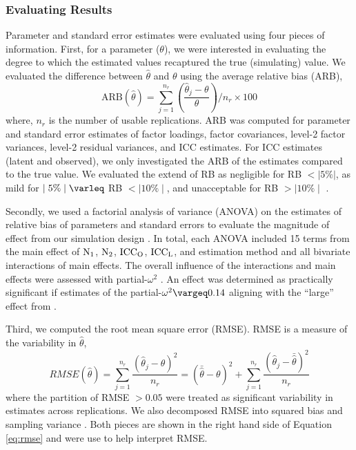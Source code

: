 \documentclass[Review,sageh,times, doublespace]{sagej}
\renewcommand{\leq}{\varleq}
\renewcommand{\geq}{\vargeq}
\begin{document}
\subsubsection{Evaluating Results}

Parameter and standard error estimates were evaluated using four pieces of information. 
First, for a parameter ($\theta$), we were interested in evaluating the degree to which the estimated values recaptured the true (simulating) value.
We evaluated the difference between $\hat{\theta}$ and $\theta$ using the average relative bias (ARB),
\begin{equation}
\mathrm{ARB}(\hat{\theta}) = \sum_{j=1}^{n_r}\left(\frac{\hat{\theta}_j- \theta}{\theta}\right)/n_r\times 100
\end{equation}
where, $n_r$ is the number of usable replications.
ARB was computed for parameter and standard error estimates of factor loadings, factor covariances, level-2 factor variances, level-2 residual variances, and ICC estimates.
For ICC estimates (latent and observed), we only investigated the ARB of the estimates compared to the true value.
We evaluated the extend of RB as negligible for RB $< | 5\% |$, as mild for $\mid 5\%\mid \leq$ RB $< \mid 10\%\mid$, and unacceptable for RB $> \mid 10\%\mid$ \citep{Hoogland1998, Muthen1985}. 

Secondly, we used a factorial analysis of variance (ANOVA) on the estimates of relative bias of parameters and standard errors to evaluate the magnitude of effect from our simulation design \citep{Bandalos2013}.
In total, each ANOVA included 15 terms from the main effect of $\rm N_1$, $\rm N_2$, $\rm ICC_{O}$, $\rm ICC_{L}$, and estimation method and all  bivariate interactions of main effects.
The overall influence of the interactions and main effects were assessed with partial-$\omega^2$ \citep[][, p. 296]{Maxwell2004}.
An effect was determined as practically significant if estimates of the partial-$\omega^2 \geq 0.14$  aligning with the ``large'' effect from \citep{Cohen1988}.

Third, we computed the root mean square error (RMSE).
RMSE is a measure of the variability in $\hat{\theta}$,
\begin{equation}\label{eq:rmse}
RMSE(\hat\theta) = \sum_{j=1}^{n_r}\frac{(\hat\theta_j -\theta)^2}{n_r} = {\left(\bar{\hat\theta} - \theta\right)}^2 +  \sum_{j=1}^{n_r}\frac{(\hat\theta_j -\bar{\hat\theta})^2}{n_r}
\end{equation}
where the partition of RMSE $> 0.05$ were treated as significant variability in estimates across replications.
We also decomposed RMSE into squared bias and sampling variance \citep{Harwell2018}.
Both pieces are shown in the right hand side of Equation \ref{eq:rmse} and were use to help interpret RMSE.
\end{document}
